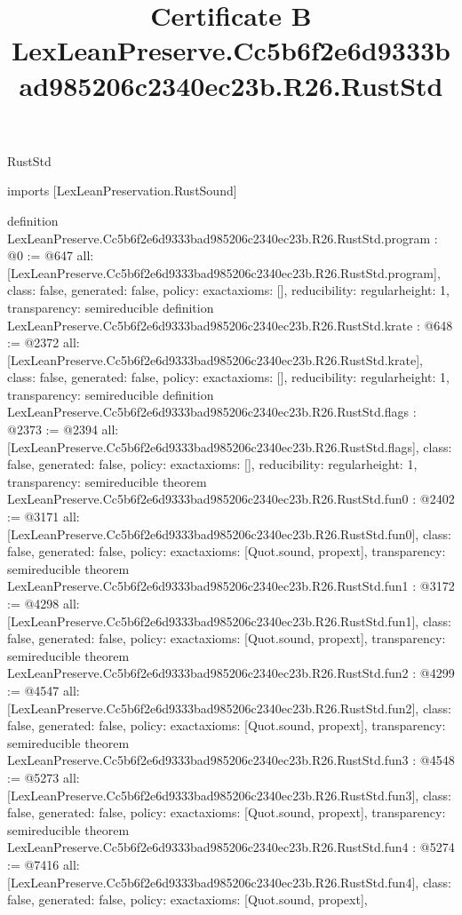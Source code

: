 \begin{lexlean}{RustStd}
\title{Certificate B LexLeanPreserve.Cc5b6f2e6d9333bad985206c2340ec23b.R26.RustStd}
\begin{coremodule}
imports [LexLeanPreservation.RustSound]

definition LexLeanPreserve.Cc5b6f2e6d9333bad985206c2340ec23b.R26.RustStd.program : @0 := @647 {
  all: [LexLeanPreserve.Cc5b6f2e6d9333bad985206c2340ec23b.R26.RustStd.program],
  class: false,
  generated: false,
  policy: exact{axioms: []},
  reducibility: regular{height: 1},
  transparency: semireducible
}
definition LexLeanPreserve.Cc5b6f2e6d9333bad985206c2340ec23b.R26.RustStd.krate : @648 := @2372 {
  all: [LexLeanPreserve.Cc5b6f2e6d9333bad985206c2340ec23b.R26.RustStd.krate],
  class: false,
  generated: false,
  policy: exact{axioms: []},
  reducibility: regular{height: 1},
  transparency: semireducible
}
definition LexLeanPreserve.Cc5b6f2e6d9333bad985206c2340ec23b.R26.RustStd.flags : @2373 := @2394 {
  all: [LexLeanPreserve.Cc5b6f2e6d9333bad985206c2340ec23b.R26.RustStd.flags],
  class: false,
  generated: false,
  policy: exact{axioms: []},
  reducibility: regular{height: 1},
  transparency: semireducible
}
theorem LexLeanPreserve.Cc5b6f2e6d9333bad985206c2340ec23b.R26.RustStd.fun0 : @2402 := @3171 {
  all: [LexLeanPreserve.Cc5b6f2e6d9333bad985206c2340ec23b.R26.RustStd.fun0],
  class: false,
  generated: false,
  policy: exact{axioms: [Quot.sound, propext]},
  transparency: semireducible
}
theorem LexLeanPreserve.Cc5b6f2e6d9333bad985206c2340ec23b.R26.RustStd.fun1 : @3172 := @4298 {
  all: [LexLeanPreserve.Cc5b6f2e6d9333bad985206c2340ec23b.R26.RustStd.fun1],
  class: false,
  generated: false,
  policy: exact{axioms: [Quot.sound, propext]},
  transparency: semireducible
}
theorem LexLeanPreserve.Cc5b6f2e6d9333bad985206c2340ec23b.R26.RustStd.fun2 : @4299 := @4547 {
  all: [LexLeanPreserve.Cc5b6f2e6d9333bad985206c2340ec23b.R26.RustStd.fun2],
  class: false,
  generated: false,
  policy: exact{axioms: [Quot.sound, propext]},
  transparency: semireducible
}
theorem LexLeanPreserve.Cc5b6f2e6d9333bad985206c2340ec23b.R26.RustStd.fun3 : @4548 := @5273 {
  all: [LexLeanPreserve.Cc5b6f2e6d9333bad985206c2340ec23b.R26.RustStd.fun3],
  class: false,
  generated: false,
  policy: exact{axioms: [Quot.sound, propext]},
  transparency: semireducible
}
theorem LexLeanPreserve.Cc5b6f2e6d9333bad985206c2340ec23b.R26.RustStd.fun4 : @5274 := @7416 {
  all: [LexLeanPreserve.Cc5b6f2e6d9333bad985206c2340ec23b.R26.RustStd.fun4],
  class: false,
  generated: false,
  policy: exact{axioms: [Quot.sound, propext]},
}
\end{coremodule}
\end{lexlean}
